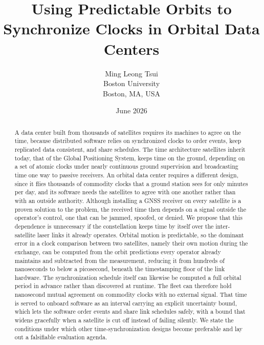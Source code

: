 \documentclass[twocolumn,10pt]{article}
\title{\LARGE\bfseries Using Predictable Orbits to Synchronize Clocks in Orbital Data Centers}
\author{%
Ming Leong Tsui\\
\normalsize Boston University\\
\normalsize Boston, MA, USA}
\date{\normalsize June 2026}
\begin{document}
\maketitle

\begin{abstract}
\noindent
A data center built from thousands of satellites requires its machines to agree on the time, because distributed software relies on synchronized clocks to order events, keep replicated data consistent, and share schedules. The time architecture satellites inherit today, that of the Global Positioning System, keeps time on the ground, depending on a set of atomic clocks under nearly continuous ground supervision and broadcasting time one way to passive receivers. An orbital data center requires a different design, since it flies thousands of commodity clocks that a ground station sees for only minutes per day, and its software needs the satellites to agree with one another rather than with an outside authority. Although installing a GNSS receiver on every satellite is a proven solution to the problem, the received time then depends on a signal outside the operator's control, one that can be jammed, spoofed, or denied. We propose that this dependence is unnecessary if the constellation keeps time by itself over the inter-satellite laser links it already operates. Orbital motion is predictable, so the dominant error in a clock comparison between two satellites, namely their own motion during the exchange, can be computed from the orbit predictions every operator already maintains and subtracted from the measurement, reducing it from hundreds of nanoseconds to below a picosecond, beneath the timestamping floor of the link hardware. The synchronization schedule itself can likewise be computed a full orbital period in advance rather than discovered at runtime. The fleet can therefore hold nanosecond mutual agreement on commodity clocks with no external signal. That time is served to onboard software as an interval carrying an explicit uncertainty bound, which lets the software order events and share link schedules safely, with a bound that widens gracefully when a satellite is cut off instead of failing silently. We state the conditions under which other time-synchronization designs become preferable and lay out a falsifiable evaluation agenda.
\end{abstract}
\end{document}
